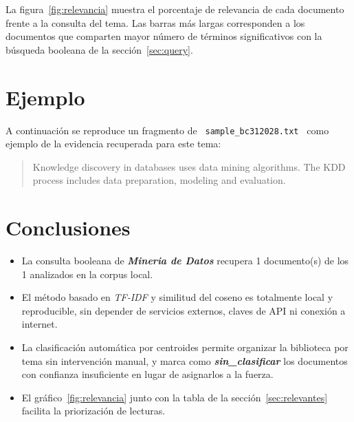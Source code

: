 \documentclass[11pt,a4paper]{article}
\newcommand{\tema}[1]{\textbf{\textit{#1}}}
\newcommand{\nombrearchivo}[1]{\texttt{#1}}
\begin{document}
La figura~\ref{fig:relevancia} muestra el porcentaje de relevancia de cada
documento frente a la consulta del tema. Las barras más largas corresponden a
los documentos que comparten mayor número de términos significativos con la
búsqueda booleana de la sección~\ref{sec:query}.


\section{Ejemplo}
\label{sec:ejemplo}

A continuación se reproduce un fragmento de
\nombrearchivo{ sample\_bc312028.txt } como ejemplo de la evidencia
recuperada para este tema:

\begin{quote}
\small
Knowledge discovery in databases uses data mining algorithms. The KDD process includes data preparation, modeling and evaluation.
\end{quote}


\section{Conclusiones}
\label{sec:conclusiones}

\begin{itemize}
\setlength{\itemsep}{4pt}
  \item La consulta booleana de \tema{ Mineria de Datos } recupera
        1 documento(s) de los 1
        analizados en la corpus local.
  \item El método basado en \textit{TF-IDF} y similitud del coseno es
        totalmente local y reproducible, sin depender de servicios externos,
        claves de API ni conexión a internet.
  \item La clasificación automática por centroides permite organizar la
        biblioteca por tema sin intervención manual, y marca como
        \tema{sin\_clasificar} los documentos con confianza insuficiente en
        lugar de asignarlos a la fuerza.
  \item El gráfico~\ref{fig:relevancia} junto con la tabla de la
        sección~\ref{sec:relevantes} facilita la priorización de lecturas.
\end{itemize}
\end{document}
